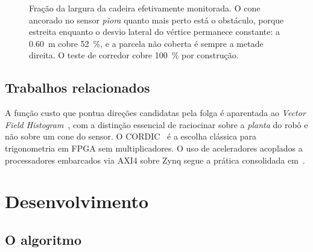 \documentclass[conference]{IEEEtran}
\begin{document}
\begin{figure}[!t]
\centering
{}
\caption{Fra\c{c}\~ao da largura da cadeira efetivamente monitorada. O cone
ancorado no sensor \emph{piora} quanto mais perto est\'a o obst\'aculo, porque
estreita enquanto o desvio lateral do v\'ertice permanece constante: a
\SI{0.60}{\metre} cobre \SI{52}{\percent}, e a parcela n\~ao coberta \'e sempre a
metade direita. O teste de corredor cobre \SI{100}{\percent} por
constru\c{c}\~ao.}
\label{fig:cobertura}
\end{figure}

\subsection{Trabalhos relacionados}

A fun\c{c}\~ao custo que pontua dire\c{c}\~oes candidatas pela folga \'e
aparentada ao \emph{Vector Field Histogram}~\cite{borenstein1991}, com a
distin\c{c}\~ao essencial de raciocinar sobre a \emph{planta} do rob\^o e n\~ao
sobre um cone do sensor. O CORDIC~\cite{volder1959,andraka1998} \'e a escolha
cl\'assica para trigonometria em FPGA sem multiplicadores. O uso de aceleradores
acoplados a processadores embarcados via AXI4 sobre Zynq segue a pr\'atica
consolidada em~\cite{zynqbook}.

\section{Desenvolvimento}

\subsection{O algoritmo}
\end{document}
